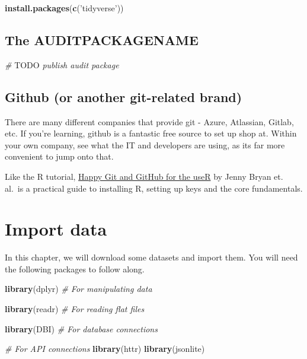 \documentclass[
]{book}
\newenvironment{Shaded}{\begin{snugshade}}{\end{snugshade}}
\newcommand{\AlertTok}[1]{\textcolor[rgb]{0.94,0.16,0.16}{#1}}
\newcommand{\CommentTok}[1]{\textcolor[rgb]{0.56,0.35,0.01}{\textit{#1}}}
\newcommand{\KeywordTok}[1]{\textcolor[rgb]{0.13,0.29,0.53}{\textbf{#1}}}
\newcommand{\NormalTok}[1]{#1}
\newcommand{\StringTok}[1]{\textcolor[rgb]{0.31,0.60,0.02}{#1}}
\begin{document}
\begin{Shaded}
\begin{Highlighting}[]
\KeywordTok{install.packages}\NormalTok{(}\KeywordTok{c}\NormalTok{(}\StringTok{'tidyverse'}\NormalTok{))}
\end{Highlighting}
\end{Shaded}

\hypertarget{the-auditpackagename}{%
\section{The AUDITPACKAGENAME}\label{the-auditpackagename}}

\begin{Shaded}
\begin{Highlighting}[]
\CommentTok{# }\AlertTok{TODO}\CommentTok{ publish audit package}
\end{Highlighting}
\end{Shaded}

\hypertarget{github-or-another-git-related-brand}{%
\section{Github (or another git-related brand)}\label{github-or-another-git-related-brand}}

There are many different companies that provide git - Azure, Atlassian, Gitlab, etc. If you're learning, github is a fantastic free source to set up shop at. Within your own company, see what the IT and developers are using, as its far more convenient to jump onto that.

Like the R tutorial, \href{https://happygitwithr.com}{Happy Git and GitHub for the useR} by Jenny Bryan et. al.~is a practical guide to installing R, setting up keys and the core fundamentals.

\hypertarget{import-data}{%
\chapter{Import data}\label{import-data}}

In this chapter, we will download some datasets and import them. You will need the following packages to follow along.

\begin{Shaded}
\begin{Highlighting}[]
\KeywordTok{library}\NormalTok{(dplyr) }\CommentTok{# For manipulating data}

\KeywordTok{library}\NormalTok{(readr) }\CommentTok{# For reading flat files}

\KeywordTok{library}\NormalTok{(DBI) }\CommentTok{# For database connections}

\CommentTok{# For API connections}
\KeywordTok{library}\NormalTok{(httr)}
\KeywordTok{library}\NormalTok{(jsonlite)}
\end{Highlighting}
\end{Shaded}
\end{document}
